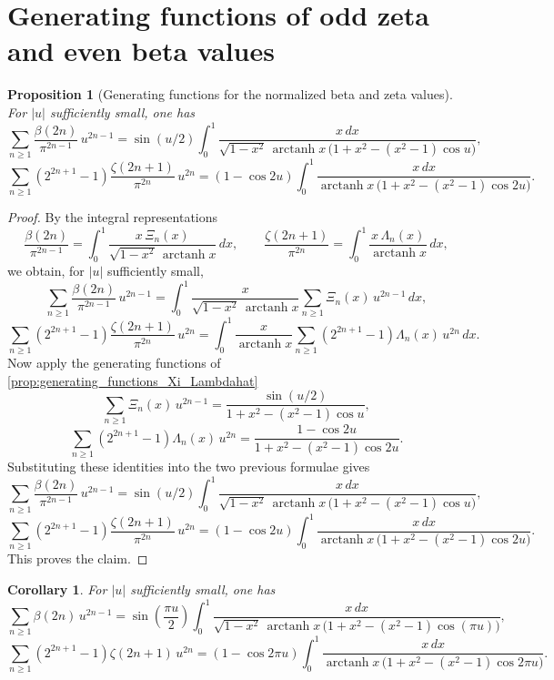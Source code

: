 \documentclass[11pt,twoside]{article}
\newtheorem{proposition}[theorem]{Proposition}
\newtheorem{corollary}[theorem]{Corollary}
\numberwithin{equation}{section}
\begin{document}
\section{Generating functions of odd zeta and even beta values}

\begin{proposition}[Generating functions for the normalized beta and zeta values]
For \(|u|\) sufficiently small, one has
\[
\sum_{n\ge1}\frac{\beta(2n)}{\pi^{2n-1}}\,u^{2n-1}
=
\sin(u/2)\int_0^1
\frac{x\,dx}{
\sqrt{1-x^2}\,\operatorname{arctanh}x\,
\bigl(1+x^2-(x^2-1)\cos u\bigr)},
\]
\[
\sum_{n\ge1}(2^{2n+1}-1)\frac{\zeta(2n+1)}{\pi^{2n}}\,u^{2n}
=
(1-\cos 2u)\int_0^1
\frac{x\,dx}{
\operatorname{arctanh}x\,
\bigl(1+x^2-(x^2-1)\cos 2u\bigr)}.
\]
\end{proposition}

\begin{proof}
By the integral representations
\[
\frac{\beta(2n)}{\pi^{2n-1}}
=
\int_0^1
\frac{x\,\Xi_n(x)}{\sqrt{1-x^2}\,\operatorname{arctanh}x}\,dx,
\qquad
\frac{\zeta(2n+1)}{\pi^{2n}}
=
\int_0^1
\frac{x\,\Lambda_n(x)}{\operatorname{arctanh}x}\,dx,
\]
we obtain, for \(|u|\) sufficiently small,
\[
\sum_{n\ge1}\frac{\beta(2n)}{\pi^{2n-1}}\,u^{2n-1}
=
\int_0^1
\frac{x}{\sqrt{1-x^2}\,\operatorname{arctanh}x}
\sum_{n\ge1}\Xi_n(x)\,u^{2n-1}\,dx,
\]
\[
\sum_{n\ge1}(2^{2n+1}-1)\frac{\zeta(2n+1)}{\pi^{2n}}\,u^{2n}
=
\int_0^1
\frac{x}{\operatorname{arctanh}x}
\sum_{n\ge1}(2^{2n+1}-1)\Lambda_n(x)\,u^{2n}\,dx.
\]
Now apply the generating functions of \cref{prop:generating_functions_Xi_Lambdahat}
\[
\sum_{n\ge1}\Xi_n(x)\,u^{2n-1}
=
\frac{\sin(u/2)}{1+x^2-(x^2-1)\cos u},
\]
\[
\sum_{n\ge1}(2^{2n+1}-1)\Lambda_n(x)\,u^{2n}
=
\frac{1-\cos 2u}{1+x^2-(x^2-1)\cos 2u}.
\]
Substituting these identities into the two previous formulae gives
\[
\sum_{n\ge1}\frac{\beta(2n)}{\pi^{2n-1}}\,u^{2n-1}
=
\sin(u/2)\int_0^1
\frac{x\,dx}{
\sqrt{1-x^2}\,\operatorname{arctanh}x\,
\bigl(1+x^2-(x^2-1)\cos u\bigr)},
\]
\[
\sum_{n\ge1}(2^{2n+1}-1)\frac{\zeta(2n+1)}{\pi^{2n}}\,u^{2n}
=
(1-\cos 2u)\int_0^1
\frac{x\,dx}{
\operatorname{arctanh}x\,
\bigl(1+x^2-(x^2-1)\cos 2u\bigr)}.
\]
This proves the claim.
\end{proof}

\begin{corollary}
For \(|u|\) sufficiently small, one has
\[
\sum_{n\ge1}\beta(2n)\,u^{2n-1}
=
\sin\!\left(\frac{\pi u}{2}\right)\int_0^1
\frac{x\,dx}{
\sqrt{1-x^2}\,\operatorname{arctanh}x\,
\bigl(1+x^2-(x^2-1)\cos (\pi u)\bigr)},
\]
\[
\sum_{n\ge1}(2^{2n+1}-1)\zeta(2n+1)\,u^{2n}
=
(1-\cos 2\pi u)\int_0^1
\frac{x\,dx}{
\operatorname{arctanh}x\,
\bigl(1+x^2-(x^2-1)\cos 2\pi u\bigr)}.
\]
\end{corollary}
\end{document}
